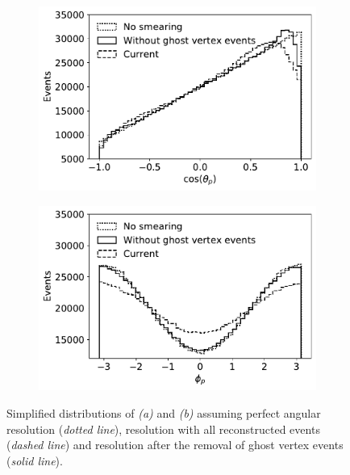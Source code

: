 \begin{figure}[t]
	\centering
	\begin{subfigure}{.45\textwidth}
		\includegraphics[width=\textwidth]{graphics/05-angular_distributions/ctheta_bw.pdf}
		\caption{}
		\label{fig:5:ctheta_bw}
	\end{subfigure}
	\begin{subfigure}{.45\textwidth}
		\includegraphics[width=\textwidth]{graphics/05-angular_distributions/phi_bw.pdf}
		\caption{}
		\label{fig:5:phi_bw}
	\end{subfigure}
	\caption{Simplified distributions of \cthetap \textit{(a)} and \phip \textit{(b)} assuming perfect angular resolution (\textit{dotted line}), resolution with all reconstructed \demonstratorshort events (\textit{dashed line}) and resolution after the removal of ghost vertex events (\textit{solid line}).}
	\label{fig:5:ctheta_phi_bw}
\end{figure}

